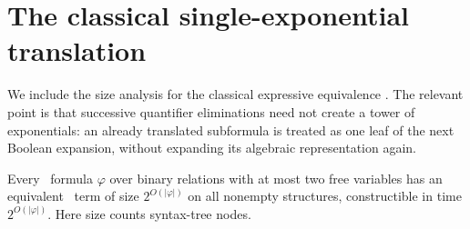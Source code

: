 \section{The classical single-exponential translation}\label{app:classical-translation}
We include the size analysis for the classical expressive equivalence
\citep{tarski-givant1987,maddux2006}. The relevant point is that successive
quantifier eliminations need not create a tower of exponentials: an
already translated subformula is treated as one leaf of the next Boolean
expansion, without expanding its algebraic representation again.

\begin{proposition}\label{prop:upper-translation}
Every \FOthree\ formula $\varphi$ over binary relations with at most two
free variables has an equivalent \CoR\ term of size $2^{O(|\varphi|)}$
on all nonempty structures, constructible in time $2^{O(|\varphi|)}$.
Here size counts syntax-tree nodes.
\end{proposition}
